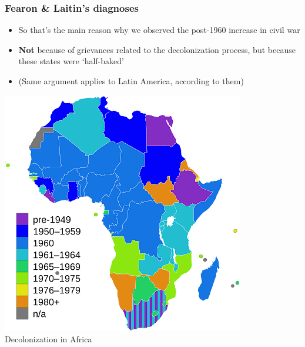 \documentclass[utf8, xcolor=dvipsnames]{beamer}
\begin{document}
\begin{frame}
\frametitle{Fearon \& Laitin's diagnoses}
\centering

\begin{minipage}{0.49\textwidth}\centering
\begin{itemize}[<+->]
  \item So that's the main reason why we observed the post-1960 increase in civil war
  \item \textbf{Not} because of grievances related to the decolonization process, but because these states were `half-baked'
  \item (Same argument applies to Latin America, according to them)
\end{itemize}
\end{minipage}\hfill
\begin{minipage}{0.49\textwidth}\centering
\includegraphics[width = \textwidth]{img/africa_decolonization}\\
Decolonization in Africa
\end{minipage}

\end{frame}
\end{document}
